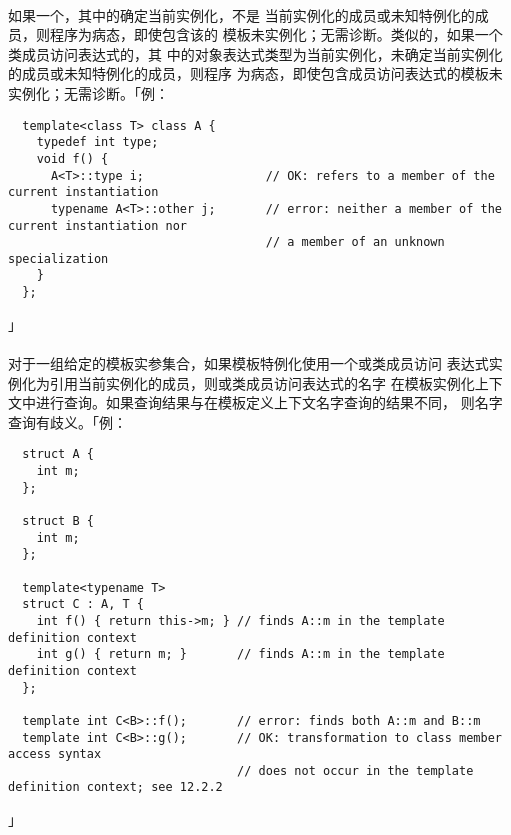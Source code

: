 \paragraph{}
如果一个，其中的确定当前实例化，不是
当前实例化的成员或未知特例化的成员，则程序为病态，即使包含该的
模板未实例化；无需诊断。类似的，如果一个类成员访问表达式的，其
中的对象表达式类型为当前实例化，未确定当前实例化的成员或未知特例化的成员，则程序
为病态，即使包含成员访问表达式的模板未实例化；无需诊断。「例：
\begin{lstlisting}
  template<class T> class A {
    typedef int type;
    void f() {
      A<T>::type i;                 // OK: refers to a member of the current instantiation
      typename A<T>::other j;       // error: neither a member of the current instantiation nor
                                    // a member of an unknown specialization
    }
  };
\end{lstlisting}」

\paragraph{}
对于一组给定的模板实参集合，如果模板特例化使用一个或类成员访问
表达式实例化为引用当前实例化的成员，则或类成员访问表达式的名字
在模板实例化上下文中进行查询。如果查询结果与在模板定义上下文名字查询的结果不同，
则名字查询有歧义。「例：
\begin{lstlisting}
  struct A {
    int m;
  };

  struct B {
    int m;
  };

  template<typename T>
  struct C : A, T {
    int f() { return this->m; } // finds A::m in the template definition context
    int g() { return m; }       // finds A::m in the template definition context
  };

  template int C<B>::f();       // error: finds both A::m and B::m
  template int C<B>::g();       // OK: transformation to class member access syntax
                                // does not occur in the template definition context; see 12.2.2
\end{lstlisting}」

